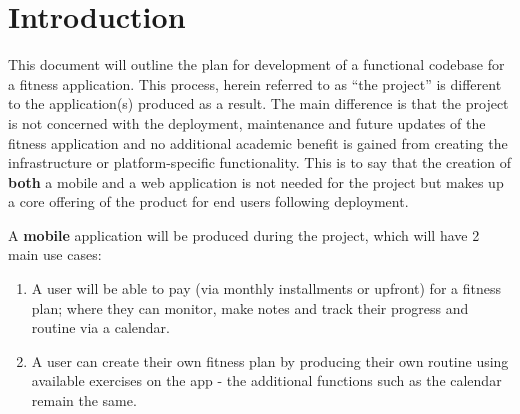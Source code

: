 \chapter{Introduction}
\raggedright
\label{chap:intro}
This document will outline the plan for development of a functional codebase for a fitness application.
This process, herein referred to as ``the project'' is different to the application(s) produced as a result.
The main difference is that the project is not concerned with the deployment, maintenance and future updates
of the fitness application and no additional academic benefit is gained from creating the
infrastructure or platform-specific functionality. This is to say that the creation
of \textbf{both} a mobile and a web application is not needed for the project but makes up
a core offering of the product for end users following deployment.
\par
\noindent
A \textbf{mobile} application will be produced during the project, which will have 2 main use cases:
\begin{enumerate}
	\item A user will be able to pay (via monthly installments or upfront) for a
	      fitness plan; where they can monitor, make notes and track their
	      progress and routine via a calendar.
	\item A user can create their own fitness plan by producing their own routine using
	      available exercises on the app - the additional functions such as the calendar remain
	      the same.
\end{enumerate}
\pagebreak
